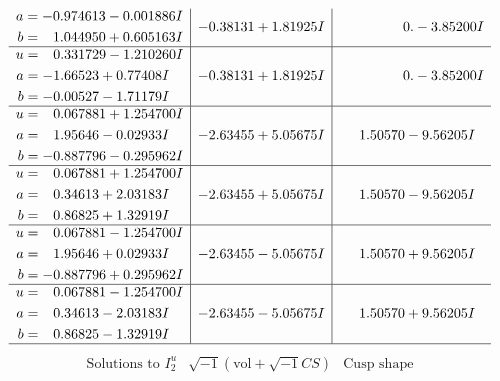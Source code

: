 \documentclass[1p]{elsarticle_modified}
\theoremstyle{definition}
\newcommand{\I}{\sqrt{-1}}
\begin{document}
$$\begin{array}{c|c|c}
\begin{aligned}
a &= -0.974613 - 0.001886 I \\
b &= \phantom{-}1.044950 + 0.605163 I\end{aligned}
 & -0.38131 + 1.81925 I & \phantom{-0.000000 } 0. - 3.85200 I \\ \hline\begin{aligned}
u &= \phantom{-}0.331729 - 1.210260 I \\
a &= -1.66523 + 0.77408 I \\
b &= -0.00527 - 1.71179 I\end{aligned}
 & -0.38131 + 1.81925 I & \phantom{-0.000000 } 0. - 3.85200 I \\ \hline\begin{aligned}
u &= \phantom{-}0.067881 + 1.254700 I \\
a &= \phantom{-}1.95646 - 0.02933 I \\
b &= -0.887796 - 0.295962 I\end{aligned}
 & -2.63455 + 5.05675 I & \phantom{-}1.50570 - 9.56205 I \\ \hline\begin{aligned}
u &= \phantom{-}0.067881 + 1.254700 I \\
a &= \phantom{-}0.34613 + 2.03183 I \\
b &= \phantom{-}0.86825 + 1.32919 I\end{aligned}
 & -2.63455 + 5.05675 I & \phantom{-}1.50570 - 9.56205 I \\ \hline\begin{aligned}
u &= \phantom{-}0.067881 - 1.254700 I \\
a &= \phantom{-}1.95646 + 0.02933 I \\
b &= -0.887796 + 0.295962 I\end{aligned}
 & -2.63455 - 5.05675 I & \phantom{-}1.50570 + 9.56205 I \\ \hline\begin{aligned}
u &= \phantom{-}0.067881 - 1.254700 I \\
a &= \phantom{-}0.34613 - 2.03183 I \\
b &= \phantom{-}0.86825 - 1.32919 I\end{aligned}
 & -2.63455 - 5.05675 I & \phantom{-}1.50570 + 9.56205 I\\
 \hline 
 \end{array}$$\newpage$$\begin{array}{c|c|c}  
\text{Solutions to }I^u_{2}& \I (\text{vol} + \sqrt{-1}CS) & \text{Cusp shape}\\
 \hline 
\begin{aligned}

\end{aligned}
\end{array}$$
\end{document}
